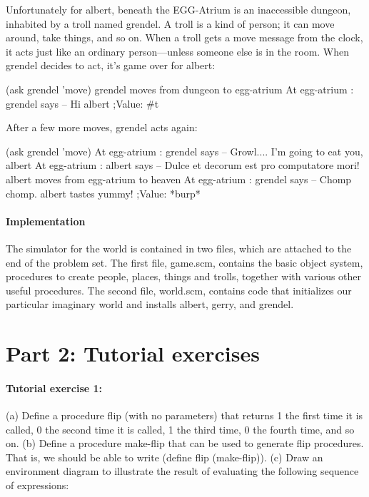 Unfortunately for {\cf albert}, beneath the EGG-Atrium is an inaccessible
dungeon, inhabited by a troll named {\cf grendel}.  A troll is a
kind of person; it can move around, take
things, and so on.  When a troll gets a {\cf  move} message from the clock,
it acts just like an ordinary person---unless someone else is in the
room.  When {\cf grendel} decides to {\cf act}, it's game over for {\cf albert}:

\beginlisp
(ask grendel 'move)
grendel moves from dungeon to egg-atrium
At egg-atrium : grendel says -- Hi albert
;Value: \#t
\endlisp

After a few more moves, {\cf grendel} acts again:

\beginlisp
(ask grendel 'move)
At egg-atrium : grendel says -- Growl.... I'm going to eat you, albert
At egg-atrium : albert says --
                   Dulce et decorum est
                   pro computatore mori!
albert moves from egg-atrium to heaven
At egg-atrium : grendel says -- Chomp chomp. albert tastes yummy!
;Value: *burp*
\endlisp

\paragraph{Implementation}

The simulator for the world is contained in two files, which are
attached to the end of the problem set. The first file, {\cf
game.scm}, contains the basic object system, procedures to create
people, places, things and trolls, together with various other useful
procedures.  The second file, {\cf world.scm}, contains code that
initializes our particular imaginary world and installs {\cf albert},
{\cf gerry}, and {\cf grendel}.

\section{Part 2: Tutorial exercises}

\paragraph{Tutorial exercise 1:}

(a) Define a procedure {\cf flip} (with no parameters) that returns 1
the first time it is called, 0 the second time it is called, 1 the
third time, 0 the fourth time, and so on.  (b) Define a procedure {\cf
make-flip} that can be used to generate {\cf flip} procedures.  That
is, we should be able to write {\cf (define flip (make-flip))}.  (c)
Draw an environment diagram to illustrate the result of evaluating the
following sequence of expressions:

